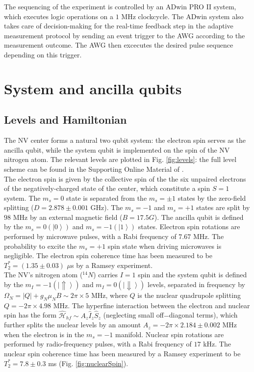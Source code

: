 \documentclass[12pt]{article}
\def\ket#1{\left|#1\right>}
\begin{document}
The sequencing of the experiment is controlled by an ADwin PRO II system, which executes logic operations on a  $1$ MHz clockcycle. The ADwin system also takes care of decision-making for the real-time feedback step in the adaptive measurement protocol by sending an event trigger to the AWG according to the measurement outcome. The AWG then excecutes the desired pulse sequence depending on this trigger.


\section{System and ancilla qubits}

\subsection{Levels and Hamiltonian}
The NV center forms a natural two qubit system: the electron spin serves as the ancilla qubit, while the system qubit is implemented on the spin of the NV nitrogen atom. The relevant levels are plotted in Fig. \ref{fig:levels}: the full level scheme can be found in the Supporting Online Material of \cite{pfaff}.\\
The electron spin is given by the collective spin of the the six unpaired electrons of the negatively-charged state of the center, which constitute a spin $S=1$ system. The $m_s=0$ state is separated from the $m_s=\pm1$ states by the zero-field splitting ($D = 2.878 \pm 0.001$ GHz). The $m_s=-1$ and $m_s=+1$ states are split by $ 98$ MHz by an external magnetic field ($B = 17.5 G$). The ancilla qubit is defined by the $m_s=0  (\ket{0})$ and $m_s=-1  (\ket{1})$ states. Electron spin rotations are performed by microwave pulses, with a Rabi frequency of $ 7.67$ MHz. The probability to excite the $m_s=+1$ spin state when driving microwaves is negligible. The electron spin coherence time has been measured to be $T_2^* = (1.35 \pm 0.03)$ $\mu$s by a Ramsey experiment.\\
The NV's nitrogen atom ($^{14}N$) carries $I=1$ spin and the system qubit is defined by the $m_I = -1 (\ket{\Uparrow})$ and $m_I=0 (\ket{\Downarrow})$ levels, separated in frequency by $\Omega_N = |Q| + g_N \mu_N B \sim 2 \pi \times 5$ MHz, where $Q$ is the nuclear quadrupole splitting $Q = -2\pi \times 4.98 $ MHz. The hyperfine interaction between the electron and nuclear spin has the form $\mathcal{\hat{H}}_{hf} \sim A_z \hat{I}_z \hat{S}_z$ (neglecting small off$-$diagonal terms), which further splits the nuclear levels by an amount $A_z = -2\pi \times 2.184 \pm 0.002$ MHz when the electron is in the $m_s=-1$ manifold.
Nuclear spin rotations are performed by radio-frequency pulses, with a Rabi frequency of $17$ kHz. The nuclear spin coherence time has been measured by a Ramsey experiment to be $T_2^* = 7.8 \pm 0.3$ ms (Fig. \ref{fig:nuclearSpin}).\\
\end{document}
